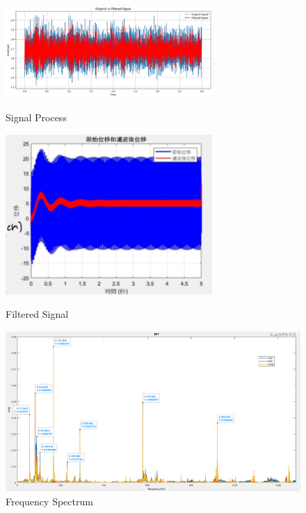\documentclass[10pt, letterpaper]{article}
\begin{document}
\begin{figure}[htbp]
        \begin{minipage}[c]{0.33\linewidth}
            \centering
            \includegraphics[width=0.7\textwidth]{fig/Numerical Analysis/濾波前後時域訊號.png}
            \caption{Signal Process}
        \end{minipage}%
        \begin{minipage}[c]{0.33\linewidth}
            \centering
            \includegraphics[width=0.7\textwidth]{fig/Numerical Analysis/原始訊號和濾波訊號.png}
            \caption{Filtered Signal}
        \end{minipage}%
        \begin{minipage}[c]{0.33\linewidth}
            \centering
            \includegraphics[width=1.0\textwidth]{fig/Numerical Analysis/1000rpm, 5000rpm, 10000rpm 頻譜圖.png}
            \caption{Frequency Spectrum}
        \end{minipage}


\end{figure}
\end{document}
